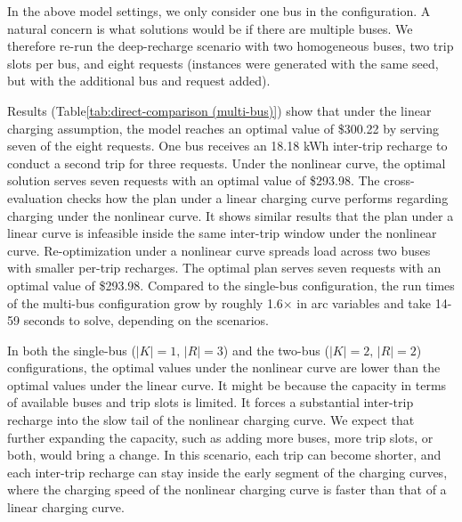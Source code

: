 \documentclass[11pt]{article}
\begin{document}
In the above model settings, we only consider one bus in the configuration. A natural concern is what solutions would be if there are multiple buses. We therefore re-run the deep-recharge scenario with two homogeneous buses, two trip slots per bus, and eight requests (instances were generated with the same seed, but with the additional bus and request added).

Results (Table\ref{tab:direct-comparison (multi-bus)}) show that under the linear charging assumption, the model reaches an optimal value of \$300.22 by serving seven of the eight requests. One bus receives an 18.18 kWh inter-trip recharge to conduct a second trip for three requests. Under the nonlinear curve, the optimal solution serves seven requests with an optimal value of \$293.98. The cross-evaluation checks how the plan under a linear charging curve performs regarding charging under the nonlinear curve. It shows similar results that the plan under a linear curve is infeasible inside the same inter-trip window under the nonlinear curve. Re-optimization under a nonlinear curve spreads load across two buses with smaller per-trip recharges. The optimal plan serves seven requests with an optimal value of \$293.98. Compared to the single-bus configuration, the run times of the multi-bus configuration grow by roughly 1.6\(\times\) in arc variables and take 14-59 seconds to solve, depending on the scenarios.

In both the single-bus (\(|K|=1,\,|R|=3\)) and the two-bus (\(|K|=2,\,|R|=2\)) configurations, the optimal values under the nonlinear curve are lower than the optimal values under the linear curve. It might be because the capacity in terms of available buses and trip slots is limited. It forces a substantial inter-trip recharge into the slow tail of the nonlinear charging curve. We expect that further expanding the capacity, such as adding more buses, more trip slots, or both, would bring a change. In this scenario, each trip can become shorter, and each inter-trip recharge can stay inside the early segment of the charging curves, where the charging speed of the nonlinear charging curve is faster than that of a linear charging curve. 
\end{document}
